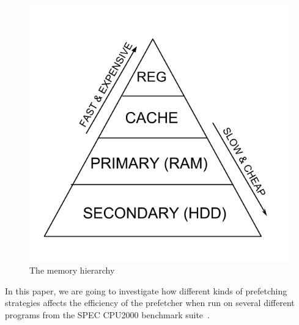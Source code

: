 \begin{figure}[H]
	\centering
	\includegraphics[scale=0.3]{./figures/memhier}
	\caption{The memory hierarchy}
	\label{fig:mem_hier}
\end{figure}

In this paper, we are going to investigate how different kinds of
prefetching strategies affects the efficiency of the prefetcher when
run on several different programs from the SPEC CPU2000 benchmark
suite~\cite{SPECFAQ}.
